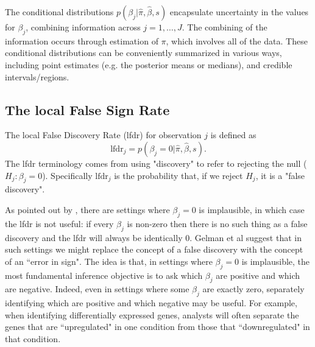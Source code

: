 \documentclass[11pt]{article}
\def\lfdr{\text{lfdr}}
\begin{document}

The conditional distributions $p(\beta_j | \hat\pi, \hat\beta, s)$ 
encapsulate uncertainty in the values for $\beta_j$, combining information across
$j=1,\dots,J$. The combining of the information occurs through estimation of
$\pi$, which involves all of the data.
These conditional distributions can be conveniently summarized
in various ways, including point estimates (e.g. the posterior means or medians),
and credible intervals/regions.



\subsection*{The local False Sign Rate}

The local False Discovery Rate (lfdr) for observation $j$ is defined \cite{efron} as
\begin{equation}
\lfdr_j = p(\beta_j = 0 | \hat\pi, \hat\beta, s).
\end{equation}
The lfdr terminology comes from using "discovery" to refer to rejecting the null ($H_j:\beta_j=0$).
Specifically $\lfdr_j$ is the probability that, if we reject $H_j$,
it is a  "false discovery".  

As pointed out by \cite{gelman.etal}, there are settings where
$\beta_j=0$ is implausible, in which case the lfdr is not useful: if every $\beta_j$ is non-zero then there
is no such thing as a false discovery and the lfdr will always be identically 0. 
Gelman et al suggest that in such settings we
might replace the concept of a false discovery with the
concept of an ``error in sign". The idea is that, in settings where $\beta_j=0$ is implausible, the most fundamental
inference objective is to ask which $\beta_j$ are positive and which are negative. Indeed, even in settings where some
$\beta_j$ are exactly zero, separately identifying which are positive and which negative may be useful. For example, when identifying differentially expressed genes,
analysts will often separate the genes that are ``upregulated" in one condition from those that ``downregulated" in that condition.
\end{document}
